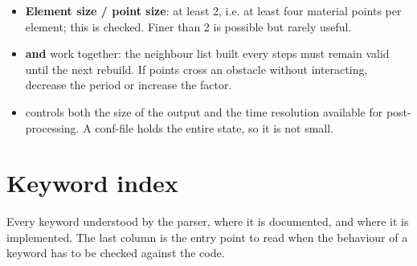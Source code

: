 \documentclass[a4paper,onecolumn,11pt]{doofus}
\begin{document}
\begin{itemize}
\item \textbf{Element size / point size}: at least 2, i.e. at least four material points per
      element; this is checked. Finer than 2 is possible but rarely useful.
\item \textbf{ and } work together: the neighbour
      list built every  steps must remain valid until the next rebuild. If
      points cross an obstacle without interacting, decrease the period or increase the factor.
\item \textbf{} controls both the size of the output and the time resolution
      available for post-processing. A conf-file holds the entire state, so it is not small.
\end{itemize}


\appendix
\renewcommand{\thesection}{\Alph{section}}
\setcounter{section}{0}

\section{Keyword index}
\label{sec:index}

Every keyword understood by the parser, where it is documented, and where it is implemented.
The last column is the entry point to read when the behaviour of a keyword has to be checked
against the code.
\end{document}
